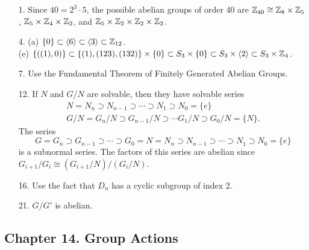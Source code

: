 {\small
\begin{itemize}
 
\item[1.] 
Since $40 = 2^3 \cdot 5$, the possible abelian groups of order 40 are 
${\Bbb Z}_{40} \cong {\Bbb Z}_{8} \times {\Bbb Z}_{5}$, 
${\Bbb Z}_{5} \times {\Bbb Z}_{4} \times {\Bbb Z}_{2}$, and
${\Bbb Z}_{5} \times {\Bbb Z}_{2} \times {\Bbb Z}_{2} \times {\Bbb
Z}_{2}$. 
 
\item[4.] 
(a) $\{ 0 \} \subset \langle 6 \rangle \subset \langle 3
\rangle \subset {\Bbb Z}_{12}$. \\
(e) 
$\{ ((1), 0)  \} \subset \{ (1), (123), (132) \} \times \{ 0 \}  
\subset S_3 \times \{ 0 \}  \subset 
S_3 \times \langle 2 \rangle \subset S_3 \times {\Bbb Z}_4$.
 
\item[7.]
Use the Fundamental Theorem of Finitely Generated Abelian Groups.
 
\item[12.]
If $N$ and $G/N$ are solvable, then they have solvable series
\[
\begin{array}{c}
N = N_n \supset N_{n-1} \supset \cdots \supset N_1 \supset N_0 
= \{ e \}  \\
G/N = G_n/N \supset G_{n-1}/N \supset \cdots G_1/N \supset G_0/N 
= \{ N \}.
\end{array}
\]
The series
\[
G = G_n \supset G_{n-1}	\supset \cdots \supset G_0 = N = N_n \supset
N_{n-1} \supset \cdots \supset N_1 \supset N_0 = \{ e \} 
\]
is a subnormal series. The factors of this series are abelian since
$G_{i+1}/G_i \cong (G_{i+1}/N)/(G_i/N)$.
 
\item[16.]
Use the fact that $D_n$ has a cyclic subgroup of index 2.
 
\item[21.]
$G/G'$ is abelian.
 
 
\end{itemize}
}
 
\subsection*{Chapter 14. Group Actions}
 
